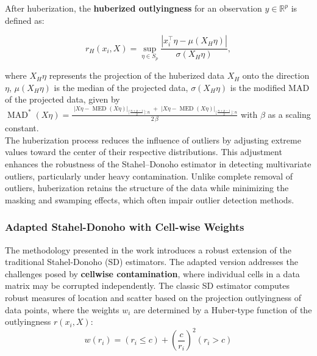 \documentclass[12pt]{article}
\begin{document}
After huberization, the \textbf{huberized outlyingness} for an observation $y \in \mathbb{R}^p$ is defined as:

$$
r_H(x_i, X) = \sup_{\eta \in S_p} \frac{|x_i^\top \eta - \mu(X_H \eta)|}{\sigma(X_H \eta)},
$$

where $X_H \eta$ represents the projection of the huberized data $X_H$ onto the direction $\eta$, $\mu(X_H \eta)$ is the median of the projected data, $\sigma(X_H \eta)$ is the modified MAD of the projected data, given by $\operatorname{MAD}^*(X \eta)=
\frac{\;\left|X \eta-\operatorname{MED}(X \eta)\right|_{\lceil\frac{n+p-1}{2}\rceil : n}\;
      +\;\left|X \eta-\operatorname{MED}(X \eta)\right|_{\lfloor\frac{n+p-1}{2}\rfloor : n}}
     {2\,\beta}$ with $\beta$ as a scaling constant.\\

The huberization process reduces the influence of outliers by adjusting extreme values toward the center of their respective distributions. This adjustment enhances the robustness of the Stahel–Donoho estimator in detecting multivariate outliers, particularly under heavy contamination. Unlike complete removal of outliers, huberization retains the structure of the data while minimizing the masking and swamping effects, which often impair outlier detection methods.

\subsubsection{Adapted Stahel-Donoho with Cell-wise Weights}


The methodology presented in the work \citep{VanAelst2010} introduces a robust extension of the traditional Stahel-Donoho (SD) estimators. The adapted version addresses the challenges posed by \textbf{cellwise contamination}, where individual cells in a data matrix may be corrupted independently. The classic SD estimator computes robust measures of location and scatter based on the projection outlyingness of data points, where the weights \( w_i \) are determined by a Huber-type function of the outlyingness \( r(x_i, X) \):
\[
w(r_i) = (r_i \leq c) + \left( \frac{c}{r_i} \right)^2 (r_i > c)
\]
\end{document}
